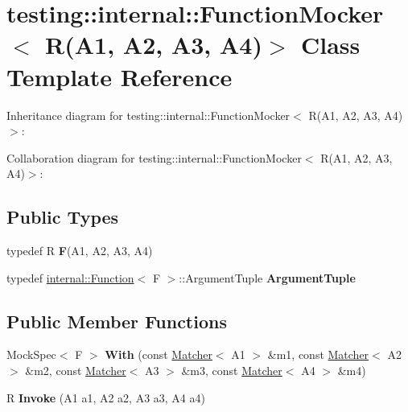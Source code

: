 \hypertarget{classtesting_1_1internal_1_1FunctionMocker_3_01R_07A1_00_01A2_00_01A3_00_01A4_08_4}{}\section{testing\+:\+:internal\+:\+:Function\+Mocker$<$ R(A1, A2, A3, A4)$>$ Class Template Reference}
\label{classtesting_1_1internal_1_1FunctionMocker_3_01R_07A1_00_01A2_00_01A3_00_01A4_08_4}


Inheritance diagram for testing\+:\+:internal\+:\+:Function\+Mocker$<$ R(A1, A2, A3, A4)$>$\+:


Collaboration diagram for testing\+:\+:internal\+:\+:Function\+Mocker$<$ R(A1, A2, A3, A4)$>$\+:
\subsection*{Public Types}
\begin{DoxyCompactItemize}
\item 
\mbox{\label{classtesting_1_1internal_1_1FunctionMocker_3_01R_07A1_00_01A2_00_01A3_00_01A4_08_4_a9be04bb962edb1458c857ca8e9db9318}} 
typedef R {\bfseries F}(A1, A2, A3, A4)
\item 
\mbox{\label{classtesting_1_1internal_1_1FunctionMocker_3_01R_07A1_00_01A2_00_01A3_00_01A4_08_4_a97576d71dfe85cbb0fc51fcaad6d4cc1}} 
typedef \hyperlink{structtesting_1_1internal_1_1Function}{internal\+::\+Function}$<$ F $>$\+::Argument\+Tuple {\bfseries Argument\+Tuple}
\end{DoxyCompactItemize}
\subsection*{Public Member Functions}
\begin{DoxyCompactItemize}
\item 
\mbox{\label{classtesting_1_1internal_1_1FunctionMocker_3_01R_07A1_00_01A2_00_01A3_00_01A4_08_4_aee6e908e8409a52c44d3a8abd2bead99}} 
Mock\+Spec$<$ F $>$ {\bfseries With} (const \hyperlink{classtesting_1_1Matcher}{Matcher}$<$ A1 $>$ \&m1, const \hyperlink{classtesting_1_1Matcher}{Matcher}$<$ A2 $>$ \&m2, const \hyperlink{classtesting_1_1Matcher}{Matcher}$<$ A3 $>$ \&m3, const \hyperlink{classtesting_1_1Matcher}{Matcher}$<$ A4 $>$ \&m4)
\item 
\mbox{\label{classtesting_1_1internal_1_1FunctionMocker_3_01R_07A1_00_01A2_00_01A3_00_01A4_08_4_ac20228ed7a21f43775a08fb3b1661721}} 
R {\bfseries Invoke} (A1 a1, A2 a2, A3 a3, A4 a4)
\end{DoxyCompactItemize}


